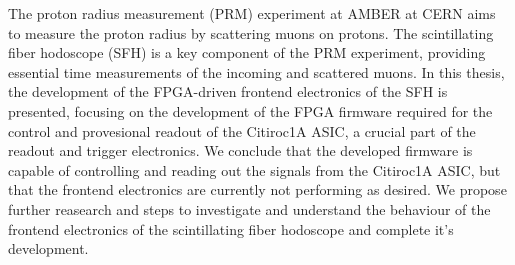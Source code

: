 The proton radius measurement (PRM) experiment at AMBER at CERN aims to measure the proton radius by scattering muons on protons.
The scintillating fiber hodoscope (SFH) is a key component of the PRM experiment, providing essential time measurements of the incoming and scattered muons.
In this thesis, the development of the FPGA-driven frontend electronics of the SFH is presented,
focusing on the development of the FPGA firmware required for the control and provesional readout of the Citiroc1A ASIC, a crucial part of the readout and trigger electronics.
\newline
We conclude that the developed firmware is capable of controlling and reading out the signals from the Citiroc1A ASIC,
but that the frontend electronics are currently not performing as desired.
We propose further reasearch and steps to investigate and understand the behaviour of the frontend electronics of the scintillating fiber hodoscope and complete it's development.
